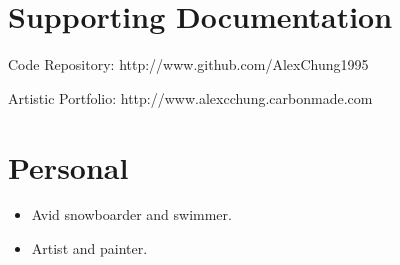 \documentclass{my_cv}
\begin{document}
\section {Supporting Documentation}
\begin{labeling}{}
\item [Code Repository:] http://www.github.com/AlexChung1995
\item [Artistic Portfolio:] http://www.alexcchung.carbonmade.com
\end{labeling}


\section {Personal}
	\begin{itemize}
	\item Avid snowboarder and swimmer.
	\item Artist and painter.
	\end{itemize}



\end{document}
